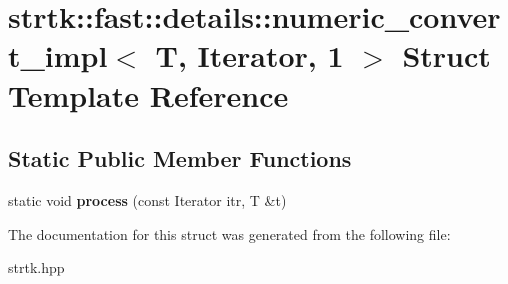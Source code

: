 \hypertarget{structstrtk_1_1fast_1_1details_1_1numeric__convert__impl_3_01T_00_01Iterator_00_011_01_4}{\section{strtk\-:\-:fast\-:\-:details\-:\-:numeric\-\_\-convert\-\_\-impl$<$ T, Iterator, 1 $>$ Struct Template Reference}
\label{structstrtk_1_1fast_1_1details_1_1numeric__convert__impl_3_01T_00_01Iterator_00_011_01_4}
}
\subsection*{Static Public Member Functions}
\begin{DoxyCompactItemize}
\item 
\hypertarget{structstrtk_1_1fast_1_1details_1_1numeric__convert__impl_3_01T_00_01Iterator_00_011_01_4_afe90399804dae3bdbe19925f36abff73}{static void {\bfseries process} (const Iterator itr, T \&t)}\label{structstrtk_1_1fast_1_1details_1_1numeric__convert__impl_3_01T_00_01Iterator_00_011_01_4_afe90399804dae3bdbe19925f36abff73}

\end{DoxyCompactItemize}


The documentation for this struct was generated from the following file\-:\begin{DoxyCompactItemize}
\item 
strtk.\-hpp\end{DoxyCompactItemize}
